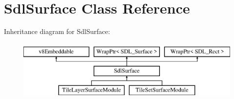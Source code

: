 \hypertarget{classSdlSurface}{}\section{Sdl\+Surface Class Reference}
\label{classSdlSurface}
Inheritance diagram for Sdl\+Surface\+:\begin{figure}[H]
\begin{center}
\leavevmode
\includegraphics[height=3.000000cm]{classSdlSurface}
\end{center}
\end{figure}
